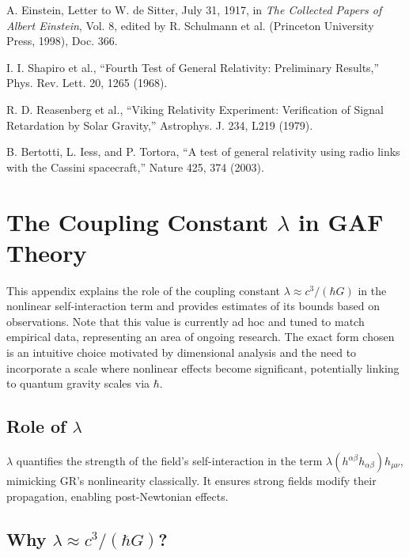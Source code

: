 \documentclass{article}
\begin{document}
\begin{thebibliography}{9}
A. Einstein, Letter to W. de Sitter, July 31, 1917, in \textit{The Collected Papers of Albert Einstein}, Vol. 8, edited by R. Schulmann et al. (Princeton University Press, 1998), Doc. 366.

I. I. Shapiro et al., ``Fourth Test of General Relativity: Preliminary Results,'' Phys. Rev. Lett. 20, 1265 (1968).

R. D. Reasenberg et al., ``Viking Relativity Experiment: Verification of Signal Retardation by Solar Gravity,'' Astrophys. J. 234, L219 (1979).

B. Bertotti, L. Iess, and P. Tortora, ``A test of general relativity using radio links with the Cassini spacecraft,'' Nature 425, 374 (2003).

\end{thebibliography}

\appendix

\section{The Coupling Constant \(\lambda\) in GAF Theory}

This appendix explains the role of the coupling constant \(\lambda \approx c^3 / (\hbar G)\) in the nonlinear self-interaction term and provides estimates of its bounds based on observations. Note that this value is currently ad hoc and tuned to match empirical data, representing an area of ongoing research. The exact form chosen is an intuitive choice motivated by dimensional analysis and the need to incorporate a scale where nonlinear effects become significant, potentially linking to quantum gravity scales via \(\hbar\).

\subsection{Role of \(\lambda\)}

\(\lambda\) quantifies the strength of the field's self-interaction in the term \(\lambda (h^{\alpha\beta} h_{\alpha\beta}) h_{\mu\nu}\), mimicking GR's nonlinearity classically. It ensures strong fields modify their propagation, enabling post-Newtonian effects.

\subsection{Why \(\lambda \approx c^3 / (\hbar G)\)?}
\end{document}
